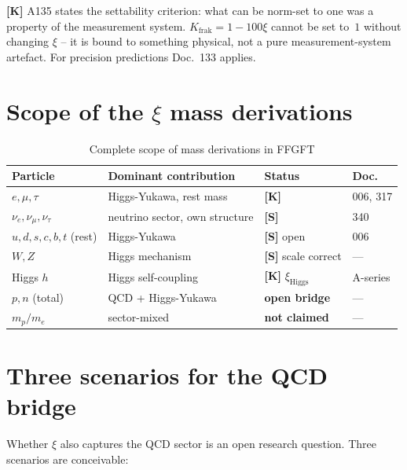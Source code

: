 \textbf{[K]} A135 states the settability criterion: what can be
norm-set to one was a property of the measurement system.
$K_{\text{frak}} = 1 - 100\xi$ cannot be set to~$1$ without changing
$\xi$ -- it is bound to something physical, not a pure measurement-system
artefact. For precision predictions Doc.~133 applies.

\section{Scope of the $\xi$ mass derivations}

\begin{table}[h]
\centering
\caption{Complete scope of mass derivations in FFGFT}
\label{tab:scope_en}
\begin{tabular}{llll}
\toprule
Particle & Dominant contribution & Status & Doc. \\
\midrule
$e, \mu, \tau$ & Higgs-Yukawa, rest mass
  & \textbf{[K]} & 006, 317 \\
$\nu_e, \nu_\mu, \nu_\tau$ & neutrino sector, own structure
  & \textbf{[S]} & 340 \\
$u, d, s, c, b, t$ (rest) & Higgs-Yukawa
  & \textbf{[S]} open & 006 \\
$W, Z$ & Higgs mechanism
  & \textbf{[S]} scale correct & --- \\
Higgs $h$ & Higgs self-coupling
  & \textbf{[K]} $\xi_{\mathrm{Higgs}}$ & A-series \\
$p, n$ (total) & QCD + Higgs-Yukawa
  & \textbf{open bridge} & --- \\
$m_p/m_e$ & sector-mixed
  & \textbf{not claimed} & --- \\
\bottomrule
\end{tabular}
\end{table}

\section{Three scenarios for the QCD bridge}

Whether $\xi$ also captures the QCD sector is an open research question.
Three scenarios are conceivable:

